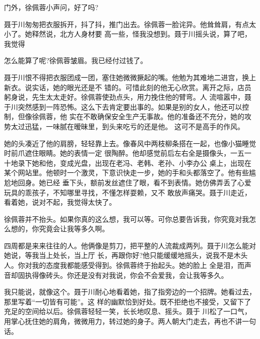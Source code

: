 \documentclass[11pt,a4paper,onecolumn]{article}
\begin{document}
门外，徐佩蓉小声问，好了吗?

聂于川匆匆把衣服拆开，抖了抖，推门出去。徐佩蓉一脸诧异。他耸耸肩，有点太小了。她释然说，北方人身材要
高一些，怪我没想到。聂于川摇头说，算了吧，我觉得\myrule{}

怎么能算了呢?徐佩蓉皱眉。我已经付过钱了。

聂于川恨不得把衣服团成一团，塞住她微微撅起的嘴。他勉为其难地二进宫，换上新衣。说实话，她的眼光还是不
错的。可惜此刻的他无心欣赏。离开之际，店员躬身说，先生太太走好。徐佩蓉使劲点头，用力挽住他的臂弯。人
流喧嚣中，聂于川突然感到一阵恐怖。这么下去肯定要出事的。如果是别的女人，他还可以控制，但像徐佩蓉，他
实在不敢确保安全生产无事故。他的准备还不充分，她的攻势太过迅猛，一味腻在暧昧里，到头来吃亏的还是他。
这可不是高手的作风。

她的头凑近了他的肩膀，轻轻靠上去。像春风中两枝柳条搭在一起，也像小猫睡觉时前爪遮住眼睛。她的表情一定
很陶醉。他却感觉前后左右全是摄像头，一五一十地录下她和他，变成光盘，出现在老冯、老韩、老孙、小李办公
桌上，出现在某个网站里。他顿时一个激灵，下意识快走一步，她的手和头都落空了。他有些尴尬地回身。她已经
垂下头，额前发丝遮住了眼，看不到表情。她仿佛弄丢了心爱玩具的乖孩子，不知哪里寻找，不懂怎样耍赖，又不
敢放声痛哭。聂于川走近，看着她，说对不起，我觉得\myrule{}太快了。

徐佩蓉并不抬头。如果你真的这么想，我可以等。可你总要告诉我，你究竟对我怎么想的，你究竟会让我等多久啊。

四周都是来来往往的人。他俩像是剪刀，把平整的人流裁成两列。聂于川怎么能对她说，等我当上处长，当上厅
长，再跟你好?他只能缓缓地摇头，说我不是木头人。你对我的态度我都能感受得到。徐佩蓉终于抬起头。她的脸上
全是泪，而声音却固执得像砖头。你还是没有对我说，你会不会爱我，会让我等多久。

我只能说，就像这个。聂于川耐心地看着她，指了指旁边的一个招牌。她看过去，那里写着“一切皆有可能”。这
样的幽默恰到好处。既不拒绝也不接受，又留下了充足的空间给以后。徐佩蓉轻轻一笑，长长地叹息、摇头。聂于
川松了一口气，用掌心抚住她的肩角，微微用力，转过她的身子。两人朝大门走去，再也不讲一句话。
\end{document}
